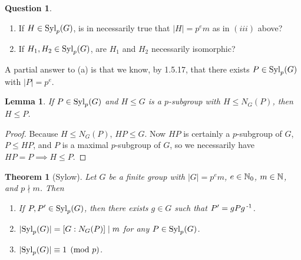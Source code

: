 \documentclass[11pt]{book}
\newcounter{counter}
\newtheorem{theorem}[counter]{Theorem}   \newtheorem*{theorem*}{Theorem}   \newtheorem{lemma}[counter]{Lemma}   \newtheorem{corollary}[counter]{Corollary}
\theoremstyle{definition}   \newtheorem{defn}[counter]{Definition} %
\newtheorem*{question}{Question}   \newtheorem*{answer}{Answer}   \newtheorem{modification}[counter]{Modification}   \newtheorem{numitem}[counter]{}
\newcommand{\vs}{\vspace{8pt}}
\numberwithin{counter}{chapter}
\begin{document}
\vs

\begin{question}
\
\begin{enumerate}
\item[(a)] If $H \in \textnormal{Syl}_p(G)$, is in necessarily true that $|H| = p^em$ as in $(iii)$ above?
\item[(b)] If $H_1,H_2 \in \textnormal{Syl}_p(G)$, are $H_1$ and $H_2$ necessarily isomorphic?
\end{enumerate}
\end{question}

A partial answer to (a) is that we know, by 1.5.17, that there exists $P \in \textnormal{Syl}_p(G)$ with $|P| = p^e$.

\vs

\begin{lemma}
If $P \in \textnormal{Syl}_p(G)$ and $H \leq G$ is a $p$-subgroup with $H \leq N_G(P)$, then $H \leq P$.
\end{lemma}

\begin{proof}
Because $H \leq N_G(P)$, $HP \leq G$. Now $HP$ is certainly a $p$-subgroup of $G$, $P \leq HP$, and $P$ is a maximal $p$-subgroup of $G$, so we necessarily have $HP = P \implies H \leq P$.
\end{proof}

\vs

\begin{theorem}[Sylow]
Let $G$ be a finite group with $|G| = p^em$, $e \in \operatorname{\mathbb{N}}_0$, $m\in \operatorname{\mathbb{N}}$, and $p \nmid m$. Then
\begin{enumerate}
\item[(a)] If $P,P' \in \textnormal{Syl}_p(G)$, then there exists $g \in G$ such that $P' = gPg\operatorname{^{-1}}$.
\item[(b)] $|\textnormal{Syl}_p(G)| = [G : N_G(P)] \mid m$ for any $P \in \textnormal{Syl}_p(G)$.
\item[(c)] $|\textnormal{Syl}_p(G)| \equiv 1 \pmod{p}$.
\end{enumerate}
\end{theorem}
\end{document}
